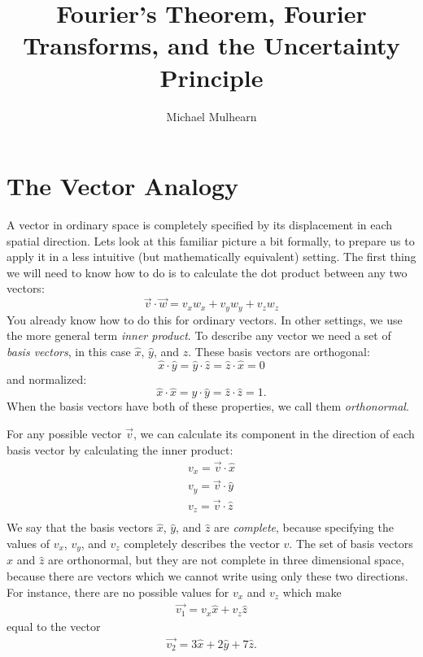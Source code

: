 \documentclass[12pt]{article}
\begin{document}
\title{Fourier's Theorem, Fourier Transforms, and the Uncertainty Principle}
\author{Michael Mulhearn}

\maketitle

\section{The Vector Analogy}

A vector in ordinary space is completely specified by its displacement in each spatial direction.  Lets look at this familiar picture a bit formally, to prepare us to apply it in a less intuitive (but mathematically equivalent) setting.  The first thing we will need to know how to do is to calculate the dot product between any two vectors:  
\begin{displaymath}
\vec{v} \cdot \vec{w} = v_x w_x + v_y w_y + v_z w_z 
\end{displaymath}
You already know how to do this for ordinary vectors.  In other settings, we use the more general term {\em inner product}.  To describe any vector we need a set of {\em basis vectors}, in this case $\hat{x}$, $\hat{y}$, and $\hat{z}$.  These basis vectors are orthogonal:
\begin{displaymath}
\hat{x} \cdot \hat{y} = \hat{y} \cdot \hat{z} = \hat{z} \cdot \hat{x} = 0
\end{displaymath}
and normalized:
\begin{displaymath}
\hat{x} \cdot \hat{x} = \hat{y} \cdot \hat{y} = \hat{z} \cdot \hat{z} = 1.
\end{displaymath}
When the basis vectors have both of these properties, we call them {\em orthonormal}.

For any possible vector $\vec{v}$, we can calculate its component in the direction of each basis vector by calculating the inner product:
\begin{eqnarray*}
v_x = \vec{v} \cdot \hat{x} \\
v_y = \vec{v} \cdot \hat{y} \\
v_z = \vec{v} \cdot \hat{z} \\
\end{eqnarray*}
We say that the basis vectors $\hat{x}$, $\hat{y}$, and $\hat{z}$ are {\em complete}, because specifying the values of $v_x$, $v_y$, and $v_z$ completely describes the vector $v$.  The set of basis vectors $\hat{x}$ and $\hat{z}$ are orthonormal, but they are not complete in three dimensional space, because there are vectors which we cannot write using only these two directions.  For instance, there are no possible values for $v_x$ and $v_z$
which make
\begin{eqnarray*}
 \vec{v_1} = v_x \hat{x} + v_z \hat{z}
\end{eqnarray*}
equal to the vector
\begin{eqnarray*}
 \vec{v_2} = 3 \hat{x} + 2 \hat{y} + 7 \hat{z}.
\end{eqnarray*}
\end{document}
